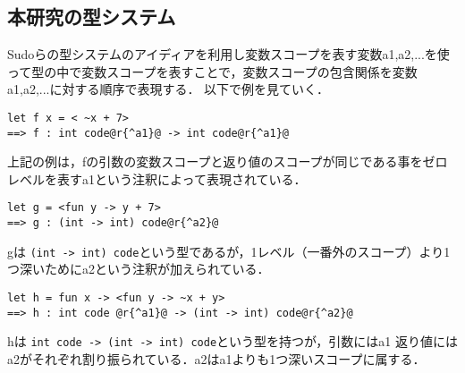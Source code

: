 \documentclass[10pt,a4j,xcolor=dvipsnames,twocolumn]{jarticle}
\theoremstyle{definition}
\begin{document}


\subsection{本研究の型システム}
Sudoらの型システムのアイディアを利用し変数スコープを表す変数a1,a2,...を使って型の中で変数スコープを表すことで，変数スコープの包含関係を変数a1,a2,...に対する順序で表現する．
以下で例を見ていく．

\begin{lstlisting}
let f x = < ~x + 7>
==> f : int code@r{^a1}@ -> int code@r{^a1}@
\end{lstlisting}
上記の例は，fの引数の変数スコープと返り値のスコープが同じである事をゼロレベルを表すa1という注釈によって表現されている．

\begin{lstlisting}
let g = <fun y -> y + 7>
==> g : (int -> int) code@r{^a2}@
\end{lstlisting}
gは \lstinline|(int -> int) code|という型であるが，1レベル（一番外のスコープ）より1つ深いためにa2という注釈が加えられている．

\begin{lstlisting}
let h = fun x -> <fun y -> ~x + y>
==> h : int code @r{^a1}@ -> (int -> int) code@r{^a2}@
\end{lstlisting}
hは \lstinline|int code -> (int -> int) code|という型を持つが，引数にはa1 返り値にはa2がそれぞれ割り振られている．a2はa1よりも1つ深いスコープに属する．
\end{document}

